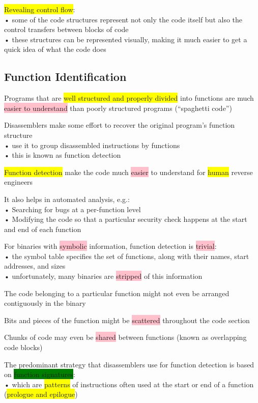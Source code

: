 \documentclass[]{project_plan}
\begin{document}
\colorbox{yellow}{Revealing control flow}:\\
• some of the code structures represent not only the code itself but also the control
transfers between blocks of code\\
• these structures can be represented visually, making it much easier to get a quick idea of
what the code does

\subsection{Function Identification}

Programs that are \colorbox{yellow}{well structured and properly divided} into functions are much
\colorbox{pink}{easier to understand} than poorly structured programs (“spaghetti code”)

Disassemblers make some effort to recover the original program’s function
structure\\
• use it to group disassembled instructions by functions\\
• this is known as function detection

\colorbox{yellow}{Function detection} make the code much \colorbox{pink}{easier} to understand for \colorbox{yellow}{human} reverse
engineers

It also helps in automated analysis, e.g.:\\
• Searching for bugs at a per-function level\\
• Modifying the code so that a particular security check happens at the start and end of each
function

For binaries with \colorbox{pink}{symbolic} information, function detection is \colorbox{pink}{trivial}:\\
• the symbol table specifies the set of functions, along with their names, start addresses,
and sizes\\
• unfortunately, many binaries are \colorbox{pink}{stripped} of this information

The code belonging to a particular function might not even be arranged
contiguously in the binary

Bits and pieces of the function might be \colorbox{pink}{scattered} throughout the code section

Chunks of code may even be \colorbox{pink}{shared} between functions (known as overlapping
code blocks)

The predominant strategy that disassemblers use for function detection is based on
\colorbox{green}{function signatures}:\\
• which are \colorbox{yellow}{patterns} of instructions often used at the start or end of a function (\colorbox{yellow}{prologue and epilogue})
\end{document}
